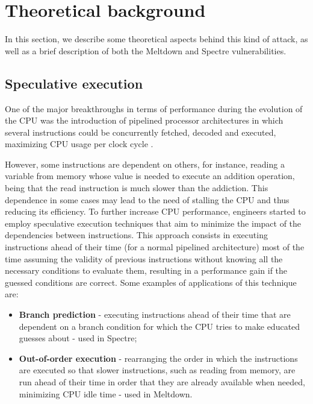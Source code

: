 \documentclass[conference]{IEEEtran}
\begin{document}
\section{Theoretical background}

In this section, we describe some theoretical aspects behind this kind of attack, as well as a brief description of both the Meltdown and Spectre vulnerabilities.

\subsection{Speculative execution}
One of the major breakthroughs in terms of performance during the evolution of the CPU was the introduction of pipelined processor architectures in which several instructions could be concurrently fetched, decoded and executed, maximizing CPU usage per clock cycle \cite{bookPatterson}.

However, some instructions are dependent on others, for instance, reading a variable from memory whose value is needed to execute an addition operation, being that the read instruction is much slower than the addiction. This dependence in some cases may lead to the need of stalling the CPU and thus reducing its efficiency. To further increase CPU performance, engineers started to employ speculative execution techniques that aim to minimize the impact of the dependencies between instructions. This approach consists in executing instructions ahead of their time (for a normal pipelined architecture) most of the time assuming the validity of previous instructions without knowing all the necessary conditions to evaluate them, resulting in a performance gain if the guessed conditions are correct. Some examples of applications of this technique are:
\begin{itemize}
  \item \textbf{Branch prediction} - executing instructions ahead of their time that are dependent on a branch condition for which the CPU tries to make educated guesses about - used in Spectre;
  \item \textbf{Out-of-order execution} - rearranging the order in which the instructions are executed so that slower instructions, such as reading from memory, are run ahead of their time in order that they are already available when needed, minimizing CPU idle time - used in Meltdown.
\end{itemize} 
\end{document}
